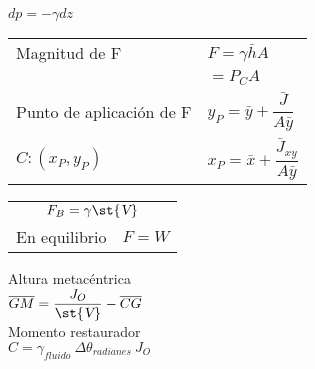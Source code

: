 \documentclass[11pt,a4paper]{article}
\newcommand{\vdes}{\st{\textsl{V}}}
\begin{document}
	
	\begin{multicols}{2}
		\begin{cajita}
			\vspace{.1cm}
			
			$dp = -\gamma dz$
			
			
		\end{cajita}
	
		\begin{cajita}
			\vspace{.1cm}
			
			\begin{tabular}{l l}
				Magnitud de F & $F = \gamma \bar{h} A$\\ & \hspace{.2cm} $= P_C A$\\
				Punto de aplicación de F & $ y_P = \bar{y} + \dfrac{\bar{J}}{A \bar{y}}$\\
				$C:(x_P, y_P)$& $x_P = \bar{x} + \dfrac{\bar{J}_{xy}}{A \bar{y}}$\\
			\end{tabular}
		\end{cajita}
	
		\begin{cajita}
			\vspace{.1cm}
			
			\begin{tabular}{l l}
				\multicolumn{2}{c}{$F_B = \gamma \vdes$}\\
				En equilibrio & $F=W$\\
			\end{tabular}
		
		\end{cajita}
	
		\begin{cajita}
			\vspace{.1cm}
			
			Altura metacéntrica\\
			$\overline{GM} = \dfrac{J_O}{\vdes} - \overline{CG}$\\
			Momento restaurador\\
			$C=\gamma_{fluido}~\Delta \theta_{radianes}~J_O$ 
			
			
			
		\end{cajita}
		

\end{multicols}
\end{document}
